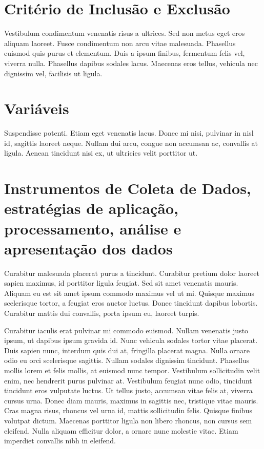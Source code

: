 \documentclass[
	12pt,				%
	a4paper,			%
    openany,
    oneside,
	english,			%
	french,				%
	spanish,			%
	brazil,				%
	]{abntex2}
\begin{document}
\section{Critério de Inclusão e Exclusão}

Vestibulum condimentum venenatis risus a ultrices. Sed non metus eget eros aliquam laoreet. Fusce condimentum non arcu vitae malesuada. Phasellus euismod quis purus et elementum. Duis a ipsum finibus, fermentum felis vel, viverra nulla. Phasellus dapibus sodales lacus. Maecenas eros tellus, vehicula nec dignissim vel, facilisis ut ligula.

\hypertarget{variaveis}{\section{Variáveis}}

Suspendisse potenti. Etiam eget venenatis lacus. Donec mi nisi, pulvinar in nisl id, sagittis laoreet neque. Nullam dui arcu, congue non accumsan ac, convallis at ligula. Aenean tincidunt nisi ex, ut ultricies velit porttitor ut.

\section{Instrumentos de Coleta de Dados, estratégias de aplicação, processamento, análise e apresentação dos dados}

Curabitur malesuada placerat purus a tincidunt. Curabitur pretium dolor laoreet sapien maximus, id porttitor ligula feugiat. Sed sit amet venenatis mauris. Aliquam eu est sit amet ipsum commodo maximus vel ut mi. Quisque maximus scelerisque tortor, a feugiat eros auctor luctus. Donec tincidunt dapibus lobortis. Curabitur mattis dui convallis, porta ipsum eu, laoreet turpis.

Curabitur iaculis erat pulvinar mi commodo euismod. Nullam venenatis justo ipsum, ut dapibus ipsum gravida id. Nunc vehicula sodales tortor vitae placerat. Duis sapien nunc, interdum quis dui at, fringilla placerat magna. Nulla ornare odio eu orci scelerisque sagittis. Nullam sodales dignissim tincidunt. Phasellus mollis lorem et felis mollis, at euismod nunc tempor. Vestibulum sollicitudin velit enim, nec hendrerit purus pulvinar at. Vestibulum feugiat nunc odio, tincidunt tincidunt eros vulputate luctus. Ut tellus justo, accumsan vitae felis at, viverra cursus urna. Donec diam mauris, maximus in sagittis nec, tristique vitae mauris. Cras magna risus, rhoncus vel urna id, mattis sollicitudin felis. Quisque finibus volutpat dictum. Maecenas porttitor ligula non libero rhoncus, non cursus sem eleifend. Nulla aliquam efficitur dolor, a ornare nunc molestie vitae. Etiam imperdiet convallis nibh in eleifend.
\end{document}
